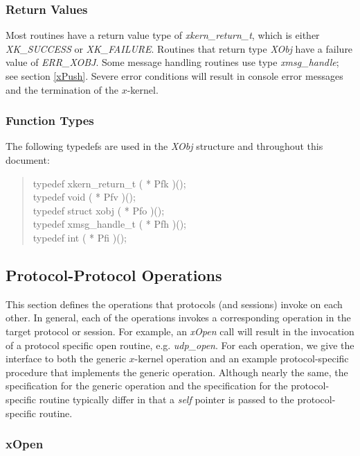 \subsubsection{Return Values}

Most routines have a return value type of {\em xkern\_return\_t},
which is either {\em XK\_SUCCESS} or {\em XK\_FAILURE}.  Routines that
return type {\em XObj} have a failure value of {\em ERR\_XOBJ}.  Some
message handling routines use type {\em xmsg\_handle}; see section
\ref{xPush}.  Severe error conditions will result in console error
messages and the termination of the $x$-kernel.

\subsubsection{Function Types}

The following typedefs are used in the {\em XObj} structure and
throughout this document:

\begin{quote}
{\sem typedef xkern\_return\_t } ( * Pfk )();\\
{\sem typedef void } ( * Pfv )();\\
{\sem typedef struct xobj } ( * Pfo )();\\
{\sem typedef xmsg\_handle\_t } ( * Pfh )();\\ 
{\sem typedef int } ( * Pfi )();
\end{quote}

\subsection{Protocol-Protocol Operations}

This section defines the operations that protocols (and sessions)
invoke on each other. In general, each of the operations invokes a
corresponding operation in the target protocol or session.  For
example, an {\em xOpen} call will result in the invocation of a
protocol specific open routine, e.g.  {\em udp\_open}.  For each
operation, we give the interface to both the generic $x$-kernel
operation and an example protocol-specific procedure that implements
the generic operation.  Although nearly the same, the specification
for the generic operation and the specification for the
protocol-specific routine typically differ in that a {\it self}
pointer is passed to the protocol-specific routine.

\subsubsection{xOpen}

